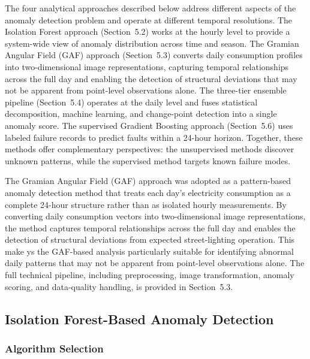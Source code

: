 \documentclass{article}
\begin{document}
The four analytical approaches described below address different
aspects of the anomaly detection problem and operate at different
temporal resolutions. The Isolation Forest approach (Section~5.2)
works at the hourly level to provide a system-wide view of anomaly
distribution across time and season. The Gramian Angular Field (GAF)
approach (Section~5.3) converts daily consumption profiles into
two-dimensional image representations, capturing temporal
relationships across the full day and enabling the detection of
structural deviations that may not be apparent from point-level
observations alone. The three-tier ensemble pipeline (Section~5.4)
operates at the daily level and fuses statistical decomposition,
machine learning, and change-point detection into a single anomaly
score. The supervised Gradient Boosting approach (Section~5.6) uses
labeled failure records to predict faults within a 24-hour horizon.
Together, these methods offer complementary perspectives: the
unsupervised methods discover unknown patterns, while the supervised method targets known failure modes.

The Gramian Angular Field (GAF) approach was adopted as a pattern-based anomaly detection method that treats each day’s electricity consumption as a complete 24-hour structure rather than as isolated hourly measurements. By converting daily consumption vectors into two-dimensional image representations, the method captures temporal relationships across the full day and enables the detection of structural deviations from expected street-lighting operation. This make ys the GAF-based analysis particularly suitable for identifying abnormal daily patterns that may not be apparent from point-level observations alone. The full technical pipeline, including preprocessing, image transformation, anomaly scoring, and data-quality handling, is provided in Section~5.3.



\subsection{Isolation Forest-Based Anomaly Detection}
\label{subsec:iforest_hourly}
\subsubsection{Algorithm Selection}
\end{document}
